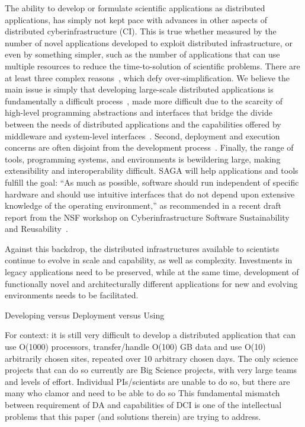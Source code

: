 \documentclass[a4paper,12pt]{article}
\begin{document}

The ability to develop or formulate scientific applications as
distributed applications,
has simply not kept pace with advances in other aspects of distributed
cyberinfrastructure (CI). This is true whether measured by the number
of novel applications developed to exploit distributed infrastructure,
or even by something simpler, such as the number of applications that
can use multiple resources to reduce the time-to-solution of
scientific problems.  There are at least three complex
reasons~\cite{dpa_grid09}, which defy over-simplification. We believe
the main issue is simply that developing large-scale distributed
applications is fundamentally a difficult process~\cite{dpa-paper},
made more difficult due to the scarcity of high-level programming
abstractions and interfaces that bridge the divide between the needs
of distributed applications and the capabilities offered by middleware
and system-level interfaces~\cite{cloud-saga-paper}. Second,
deployment and execution concerns are often disjoint from the
development process~\cite{dpa_grid09}. Finally, the range of tools,
programming systems, and environments is bewildering large, making
extensibility and interoperability difficult.  SAGA will help
applications and tools fulfill the goal: ``As much as possible,
software should run independent of specific hardware and should use
intuitive interfaces that do not depend upon extensive knowledge of
the operating environment,'' as recommended in a recent draft report
from the NSF workshop on Cyberinfrastructure Software Sustainability
and Reusability~\cite{CISSR}.


Against this backdrop, the distributed infrastructures available to
scientists continue to evolve in scale and capability, as well as
complexity.  Investments in legacy applications need to be preserved,
while at the same time, development of functionally novel and
architecturally different applications for new and evolving
environments needs to be facilitated. 

Developing versus Deployment versus Using

For context: it is still very difficult to develop a distributed
application that can use O(1000) processors, transfer/handle O(100) GB
data and use O(10) arbitrarily chosen sites, repeated over 10
arbitrary chosen days. The only science projects that can do so
currently are Big Science projects, with very large teams and levels
of effort.  Individual PIs/scientists are unable to do so, but there
are many who clamor and need to be able to do so This fundamental
mismatch between requirement of DA and capabilities of DCI is one of
the intellectual problems that this paper (and solutions therein) are
trying to address.
\end{document}
